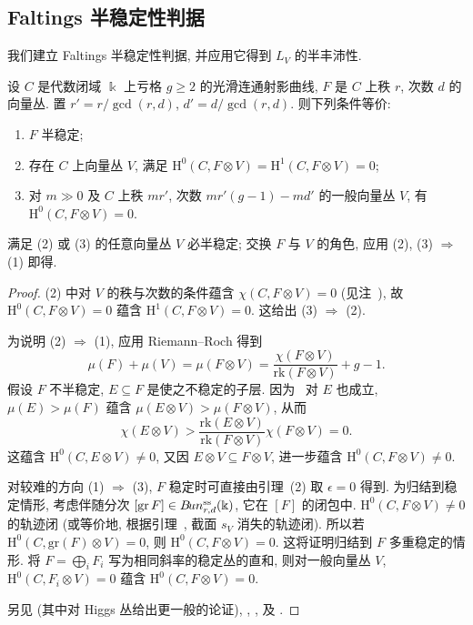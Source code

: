 \subsection{Faltings 半稳定性判据}\label{src:9.6.2-subsection}
我们建立 Faltings 半稳定性判据, 并应用它得到 $L_V$ 的半丰沛性.
\begin{theorem}\label{src:9.6.4}
设 $C$ 是代数闭域 $\Bbbk$ 上亏格 $g\geq2$ 的光滑连通射影曲线, $F$ 是 $C$ 上秩 $r$, 次数 $d$ 的向量丛. 置 $r'=r/\gcd(r,d)$, $d'=d/\gcd(r,d)$. 则下列条件等价:
\begin{enumerate}[(1)]
\item $F$ 半稳定;
\item 存在 $C$ 上向量丛 $V$, 满足 $\mathrm H^0(C,F\otimes V)=\mathrm H^1(C,F\otimes V)=0$;
\item 对 $m\gg0$ 及 $C$ 上秩 $mr'$, 次数 $mr'(g-1)-md'$ 的一般向量丛 $V$, 有 $\mathrm H^0(C,F\otimes V)=0$.
\end{enumerate}
\end{theorem}
\begin{remark}\label{src:9.6.5}
满足 (2) 或 (3) 的任意向量丛 $V$ 必半稳定; 交换 $F$ 与 $V$ 的角色, 应用 (2), (3) $\Rightarrow$ (1) 即得.
\end{remark}
\begin{proof}
(2) 中对 $V$ 的秩与次数的条件蕴含 $\chi(C,F\otimes V)=0$ (见注~), 故 $\mathrm H^0(C,F\otimes V)=0$ 蕴含 $\mathrm H^1(C,F\otimes V)=0$. 这给出 (3) $\Rightarrow$ (2).

为说明 (2) $\Rightarrow$ (1), 应用 Riemann--Roch 得到
\begin{equation}\label{src:9.6.6}
\mu(F)+\mu(V)=\mu(F\otimes V)=\frac{\chi(F\otimes V)}{\mathrm{rk}(F\otimes V)}+g-1.
\end{equation}
假设 $F$ 不半稳定, $E\subseteq F$ 是使之不稳定的子层. 因为~ 对 $E$ 也成立, $\mu(E)>\mu(F)$ 蕴含 $\mu(E\otimes V)>\mu(F\otimes V)$, 从而
\[
\chi(E\otimes V)>\frac{\mathrm{rk}(E\otimes V)}{\mathrm{rk}(F\otimes V)}\chi(F\otimes V)=0.
\]
这蕴含 $\mathrm H^0(C,E\otimes V)\neq0$, 又因 $E\otimes V\subseteq F\otimes V$, 进一步蕴含 $\mathrm H^0(C,F\otimes V)\neq0$.

对较难的方向 (1) $\Rightarrow$ (3), $F$ 稳定时可直接由引理~(2) 取 $\epsilon=0$ 得到. 为归结到稳定情形, 考虑伴随分次 $[\mathrm{gr}\,F]\in B\!un_{r,d}^{\mathrm{ss}}(\Bbbk)$, 它在 $[F]$ 的闭包中. $\mathrm H^0(C,F\otimes V)\neq0$ 的轨迹闭 (或等价地, 根据引理~, 截面 $s_V$ 消失的轨迹闭). 所以若 $\mathrm H^0(C,\mathrm{gr}(F)\otimes V)=0$, 则 $\mathrm H^0(C,F\otimes V)=0$. 这将证明归结到 $F$ 多重稳定的情形. 将 $F=\bigoplus_iF_i$ 写为相同斜率的稳定丛的直和, 则对一般向量丛 $V$, $\mathrm H^0(C,F_i\otimes V)=0$ 蕴含 $\mathrm H^0(C,F\otimes V)=0$.

另见 \cite[定理 I.2, 第 514 页]{Fal93} (其中对 Higgs 丛给出更一般的论证), \cite[引理 3.1]{Ses93}, \cite[定理 2.4]{LP96}, \cite[定理 2.5]{Hei97} 及 \cite[命题 5.2]{ABB+22}.
\end{proof}
